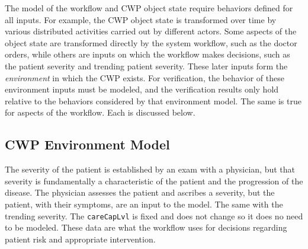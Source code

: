The model of the workflow and CWP object state require behaviors defined for all inputs. For example, the CWP object state is transformed over time by various distributed activities carried out by different actors. Some aspects of the object state are transformed directly by the system workflow, such as the doctor orders, while others are inputs on which the workflow makes decisions, such as the patient severity and trending patient severity. These later inputs form the \emph{environment} in which the CWP exists. For verification, the behavior of these environment inputs must be modeled, and the verification results only hold relative to the behaviors considered by that environment model. The same is true for aspects of the workflow. Each is discussed below.

\subsection{CWP Environment Model}
The severity of the patient is established by an exam with a physician, but that severity is fundamentally a characteristic of the patient and the progression of the disease. The physician assesses the patient and ascribes a severity, but the patient, with their symptoms, are an input to the model. The same with the trending severity. The \texttt{careCapLvl} is fixed and does not change so it does no need to be modeled. These data are what the workflow uses for decisions regarding patient risk and appropriate intervention. 

\begin{comment}
There is, of course, a causal relationship between the decisions in a workflow and the resulting subsequent input. For example, it is normally expected that when a doctor orders a patient admitted to the hospital that at some point in the future the severity rating for the patient diminishes due to the increased level of intervention and care. Here is where modeling choices can limit the impact, and meaning, of any verification results as the verification only hold for the modeled input behavior.

The intent is to create the weakest (e.g., the least restrictive) environment model possible in which a workflow is able to be verified. That means the environment model includes behavior that exists in the real world, and it includes behaviors that do not exist in the real world resulting in a \emph{sound over-approximation} of feasible environment behavior. If a workflow verifies in the sound over-approximated environment, then by implication, that verification result holds in the real world since those behaviors are a subset of the ones considered for verification. 
\end{comment}

